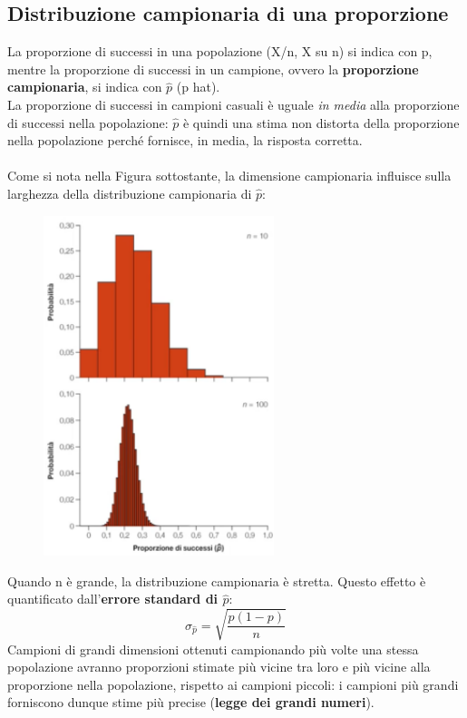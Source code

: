 \documentclass[10pt, draft]{book}
\begin{document}
\subsection{Distribuzione campionaria di una proporzione}
La proporzione di successi in una popolazione (X/n, X su n) si indica con p, mentre la proporzione di successi in un campione, ovvero la \textbf{proporzione campionaria}, si indica con $\hat{p}$ (p hat).
\\
La proporzione di successi in campioni casuali è uguale \textit{in media} alla proporzione di successi nella popolazione: $\hat{p}$ è quindi una stima non distorta della proporzione nella popolazione perché fornisce, in media, la risposta corretta.
\\
\\
Come si nota nella Figura sottostante, la dimensione campionaria influisce sulla larghezza della distribuzione campionaria di $\hat{p}$:
    \begin{figure}[h]\label{fig7.1-2}
    \centering
    \includegraphics[width=0.6\textwidth]{fig7.1-2}
    \caption{\small{}}
    \end{figure}
Quando n è grande, la distribuzione campionaria è stretta. Questo effetto è quantificato dall'\textbf{errore standard di $\hat{p}$}:
\begin{equation}
\sigma_{\hat{p}} = \sqrt{\frac{p(1-p)}{n}}
\end{equation}
\label{devstphat}
Campioni di grandi dimensioni ottenuti campionando più volte una stessa popolazione avranno proporzioni stimate più vicine tra loro e più vicine alla proporzione nella popolazione, rispetto ai campioni piccoli: i campioni più grandi forniscono dunque stime più precise (\textbf{legge dei grandi numeri}).
\end{document}

